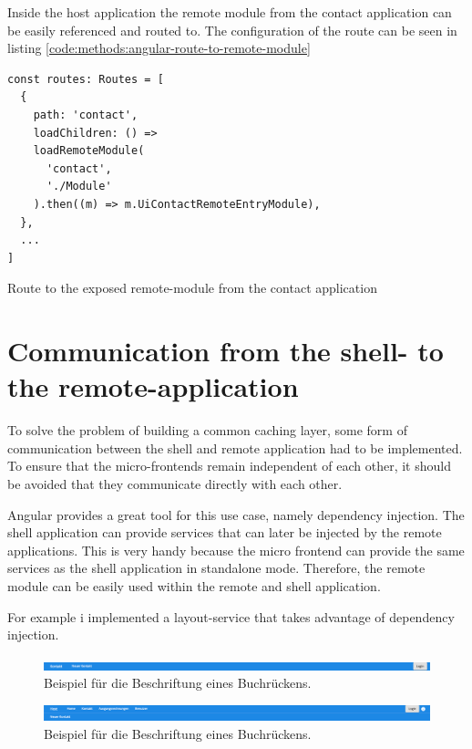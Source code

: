 Inside the host application the remote module from the contact application can be easily referenced and routed to. The configuration of the route can be seen in listing \ref{code:methods:angular-route-to-remote-module}

\ifshowListings
\begin{listing}[H]
\begin{verbatim}
const routes: Routes = [
  {
    path: 'contact',
    loadChildren: () => 
    loadRemoteModule(
      'contact', 
      './Module'
    ).then((m) => m.UiContactRemoteEntryModule),
  },
  ...
]
\end{verbatim}
\caption{Route to the exposed remote-module from the contact application}\label{code:methods:angular-route-to-remote-module}
\end{listing}
\fi

\section{Communication from the shell- to the remote-application}\label{section:methods:communication-shell-remote}

To solve the problem of building a common caching layer, some form of communication between the shell and remote application had to be implemented. To ensure that the micro-frontends remain independent of each other, it should be avoided that they communicate directly with each other.

Angular provides a great tool for this use case, namely dependency injection. The shell application can provide services that can later be injected by the remote applications. This is very handy because the micro frontend can provide the same services as the shell application in standalone mode. Therefore, the remote module can be easily used within the remote and shell application.

For example i implemented a layout-service that takes advantage of dependency injection. 

\ifshowImages
\begin{figure}[H]
\centering
\includegraphics[width=1\linewidth]{images/prototype-screenshots/contact-header.png}
\caption{Beispiel für die Beschriftung eines Buchrückens.}
\end{figure}
\fi

\ifshowImages
\begin{figure}[H]
\centering
\includegraphics[width=1\linewidth]{images/prototype-screenshots/host-contact-header.png}
\caption{Beispiel für die Beschriftung eines Buchrückens.}
\end{figure}
\fi

